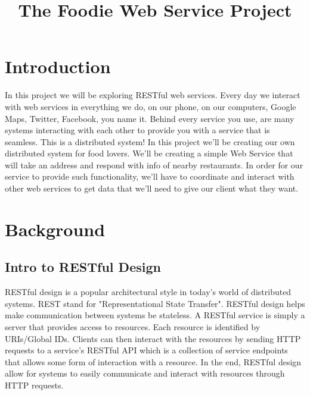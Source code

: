 \documentclass{article}
\title{The Foodie Web Service Project\\ } %
\date{} %
\begin{document}
\maketitle %


\section*{Introduction} %

In this project we will be exploring RESTful web services. Every day we interact with web services in everything we do, on our phone, on our computers, Google Maps, Twitter, Facebook, you name it. Behind every service you use, are many systems interacting with each other to provide you with a service that is seamless. This is a distributed system! In this project we'll be creating our own distributed system for food lovers. We'll be creating a simple Web Service that will take an address and respond with info of nearby restaurants. In order for our service to provide such functionality, we'll have to coordinate and interact with other web services to get data that we'll need to give our client what they want.


\section*{Background}

\subsection*{Intro to RESTful Design}
RESTful design is a popular architectural style in today's world of distributed systems. REST stand for "Representational State Transfer".  RESTful design helps make communication between systems be stateless. A RESTful service is simply a server that provides access to resources. Each resource is identified by URIs/Global IDs. Clients can then interact with the resources by sending HTTP requests to a service's RESTful API which is a collection of service endpoints that allows some form of interaction with a resource. In the end, RESTful design allow for systems to easily communicate and interact with resources through HTTP requests.
\end{document}
